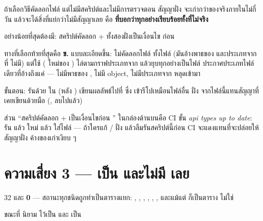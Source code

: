 \begin{badbox}[title={ทางที่ห้ามเลือก: คัดลอกด้วยมือแล้วไม่มีอะไรตรวจ}]
ถ้าเลือกวิธีคัดลอกไฟล์ แต่ไม่มีสคริปต์และไม่มีการตรวจตอน  สัญญาฝั่ง
 จะเก่ากว่าของจริงภายในไม่กี่วัน แล้วจะได้สิ่งที่แย่กว่าไม่มีสัญญาเลย
คือ \textbf{ ที่บอกว่าทุกอย่างเรียบร้อยทั้งที่ไม่จริง}

อย่างน้อยที่สุดต้องมี: สคริปต์คัดลอก +  ทั้งสองฝั่งเป็นเงื่อนไข
ก่อน 
\end{badbox}

\begin{goodbox}[title={สิ่งที่ทำจริง (\en{NFR-MNT-04})}]
ทางที่เลือกท้ายที่สุดคือ \textbf{ข.} แบบละเอียดขึ้น: ไม่คัดลอกไฟล์ 
ทั้งไฟล์ (มันอ้างพาธของ  และประเภทจาก  ที่ 
ไม่มี) แต่ใช้  ( ใหม่ของ
) ไล่ตามกราฟประเภทจาก  แล้วยุบทุกอย่างเป็นไฟล์
ประกาศประเภทไฟล์เดียวที่อ้างถึงแค่  --- ไม่มีพาธของ
, ไม่มี   object, ไม่มีประเภทจาก 
หลุดเข้ามา

ขั้นตอน:  รันด้วย
 ใน  (หลัง )
เขียนผลลัพธ์ไปที่  ซึ่ง 
เข้ารีโปเหมือนไฟล์อื่น  ฝั่ง  
จากไฟล์นี้แทนสัญญาที่เคยเขียนด้วยมือ (, ลบไปแล้ว)

ส่วน ``สคริปต์คัดลอก +  เป็นเงื่อนไขก่อน ''
ในกล่องด้านบนคือ CI   ขั้น \textit{api types up to date}:
รัน  แล้ว  ใหม่ แล้ว
 ใส่ไฟล์  --- ถ้าใครแก้
/ ฝั่ง  แล้วลืมรันสคริปต์นี้ก่อน 
CI จะแดงแทนที่จะปล่อยให้สัญญาฝั่ง  ค้างของเก่าเงียบ ๆ
\end{goodbox}

\section{ความเสี่ยง 3 ---  เป็น  และไม่มี  เลย}

\begin{goodbox}[title={นับจาก \code{schema.prisma} จริง}]
32  และ \textbf{0 } --- สถานะทุกชนิดถูกทำเป็นตารางแยก:
, , ,
, , ,
 และแม้แต่  ก็เป็นตาราง ไม่ใช่ 

ขณะที่  นิยาม  ไว้เป็น
 และ  เป็น
\end{goodbox}

